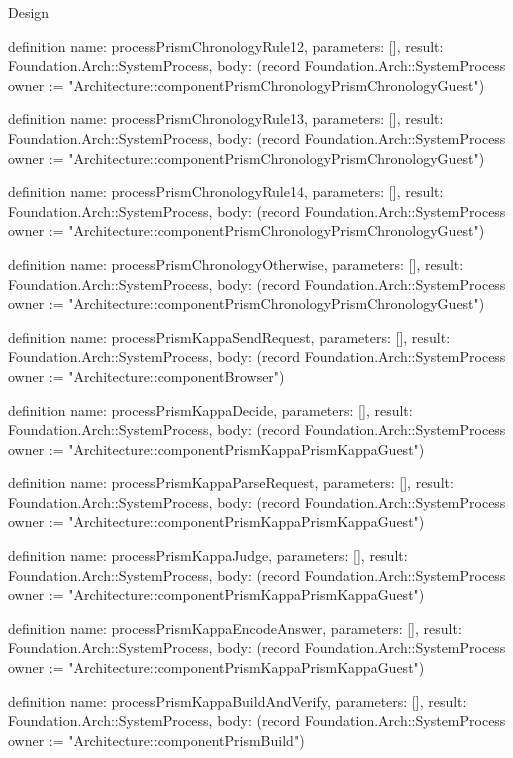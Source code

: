 \begin{lexlean}{Design}
\begin{semanticmodule}
definition{
  name: processPrismChronologyRule12,
  parameters: [],
  result: Foundation.Arch::SystemProcess,
  body: (record Foundation.Arch::SystemProcess {owner := "Architecture::componentPrismChronologyPrismChronologyGuest"})
}

definition{
  name: processPrismChronologyRule13,
  parameters: [],
  result: Foundation.Arch::SystemProcess,
  body: (record Foundation.Arch::SystemProcess {owner := "Architecture::componentPrismChronologyPrismChronologyGuest"})
}

definition{
  name: processPrismChronologyRule14,
  parameters: [],
  result: Foundation.Arch::SystemProcess,
  body: (record Foundation.Arch::SystemProcess {owner := "Architecture::componentPrismChronologyPrismChronologyGuest"})
}

definition{
  name: processPrismChronologyOtherwise,
  parameters: [],
  result: Foundation.Arch::SystemProcess,
  body: (record Foundation.Arch::SystemProcess {owner := "Architecture::componentPrismChronologyPrismChronologyGuest"})
}

definition{
  name: processPrismKappaSendRequest,
  parameters: [],
  result: Foundation.Arch::SystemProcess,
  body: (record Foundation.Arch::SystemProcess {owner := "Architecture::componentBrowser"})
}

definition{
  name: processPrismKappaDecide,
  parameters: [],
  result: Foundation.Arch::SystemProcess,
  body: (record Foundation.Arch::SystemProcess {owner := "Architecture::componentPrismKappaPrismKappaGuest"})
}

definition{
  name: processPrismKappaParseRequest,
  parameters: [],
  result: Foundation.Arch::SystemProcess,
  body: (record Foundation.Arch::SystemProcess {owner := "Architecture::componentPrismKappaPrismKappaGuest"})
}

definition{
  name: processPrismKappaJudge,
  parameters: [],
  result: Foundation.Arch::SystemProcess,
  body: (record Foundation.Arch::SystemProcess {owner := "Architecture::componentPrismKappaPrismKappaGuest"})
}

definition{
  name: processPrismKappaEncodeAnswer,
  parameters: [],
  result: Foundation.Arch::SystemProcess,
  body: (record Foundation.Arch::SystemProcess {owner := "Architecture::componentPrismKappaPrismKappaGuest"})
}

definition{
  name: processPrismKappaBuildAndVerify,
  parameters: [],
  result: Foundation.Arch::SystemProcess,
  body: (record Foundation.Arch::SystemProcess {owner := "Architecture::componentPrismBuild"})
}


\end{semanticmodule}
\end{lexlean}
